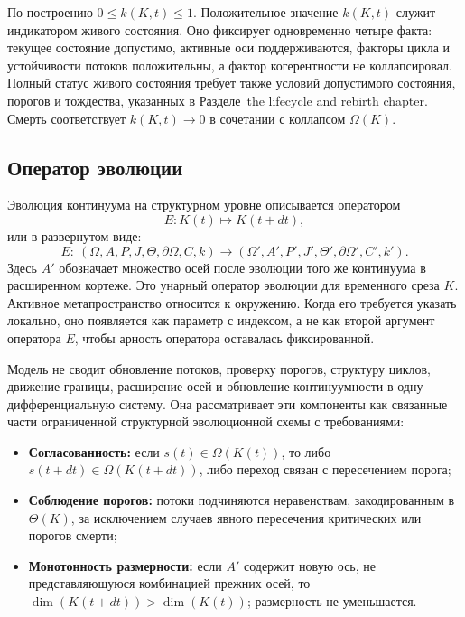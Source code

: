 По построению \(0 \le k(K,t) \le 1\).
Положительное значение \(k(K,t)\) служит индикатором живого состояния.
Оно фиксирует одновременно четыре факта: текущее состояние допустимо,
активные оси поддерживаются, факторы цикла и устойчивости потоков положительны,
а фактор когерентности не коллапсировал. Полный статус живого состояния
требует также условий допустимого состояния, порогов и тождества,
указанных в Разделе~the lifecycle and rebirth chapter.
Смерть соответствует \(k(K,t)\to 0\) в сочетании с коллапсом \(\Omega(K)\).

\subsection{Оператор эволюции}

Эволюция континуума на структурном уровне описывается оператором
\[
    E: K(t) \mapsto K(t+dt),
\]
или в развернутом виде:
\[
    E:\ (\Omega,A,P,J,\Theta,\partial\Omega,C,k)
    \longrightarrow (\Omega',A',P',J',\Theta',\partial\Omega',C',k').
\]
Здесь \(A'\) обозначает множество осей после эволюции того же континуума в расширенном кортеже.
Это унарный оператор эволюции для временного среза \(K\).
Активное метапространство относится к окружению. Когда его требуется указать локально,
оно появляется как параметр с индексом, а не как второй аргумент оператора \(E\),
чтобы арность оператора оставалась фиксированной.

Модель не сводит обновление потоков, проверку порогов, структуру циклов,
движение границы, расширение осей и обновление континуумности в одну
дифференциальную систему. Она рассматривает эти компоненты как связанные части
ограниченной структурной эволюционной схемы с требованиями:

\begin{itemize}
    \item \textbf{Согласованность:} если \(s(t) \in \Omega(K(t))\), то либо
          \(s(t+dt) \in \Omega(K(t+dt))\), либо переход связан с пересечением порога;
    \item \textbf{Соблюдение порогов:} потоки подчиняются неравенствам, закодированным в \(\Theta(K)\),
          за исключением случаев явного пересечения критических или порогов смерти;
    \item \textbf{Монотонность размерности:} если \(A'\) содержит новую ось, не представляющуюся
          комбинацией прежних осей, то \(\dim(K(t+dt)) > \dim(K(t))\); размерность не уменьшается.
\end{itemize}

